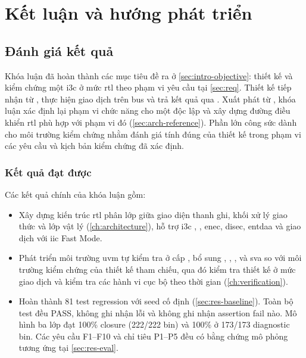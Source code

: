 \chapter{Kết luận và hướng phát triển}
\label{ch:conclusion}

\section{Đánh giá kết quả}

Khóa luận đã hoàn thành các mục tiêu đề ra ở \cref{sec:intro-objective}: thiết kế và kiểm chứng
một \gls{i3c} \Controller{} ở mức \gls{rtl} theo phạm vi yêu cầu tại \cref{sec:req}. Thiết kế tiếp nhận
\CommandDescriptor{} từ \Host{}, thực hiện giao dịch trên bus và trả kết quả qua
\ResponseDescriptor{}. Xuất phát từ \CHIPSAlliance{} \IThreeCCore{}, khóa luận xác định lại phạm vi
chức năng cho một \Controller{} độc lập và xây dựng đường điều khiển \gls{rtl} phù hợp với phạm vi đó
(\cref{sec:arch-reference}). Phần lớn công sức dành cho môi trường kiểm chứng nhằm đánh giá tính
đúng của thiết kế trong phạm vi các yêu cầu và kịch bản kiểm chứng đã xác định.

\subsection{Kết quả đạt được}

Các kết quả chính của khóa luận gồm:

\begin{itemize}
	\item Xây dựng kiến trúc \gls{rtl} phân lớp giữa giao diện thanh ghi, khối xử lý giao thức và lớp vật lý
	      (\cref{ch:architecture}), hỗ trợ \gls{i3c} \PrivateTransfer{}, \ImmediateDataTransfer{}, \gls{enec},
	      \gls{disec}, \gls{entdaa} và giao dịch với \Target{} \gls{iic} Fast Mode.

	\item Phát triển môi trường \gls{uvm} tự kiểm tra ở cấp \Controller{}, bổ sung \RegisterAgent{},
	      \Scoreboard{}, \ReferenceModel{}, \CorrelatedCoverage{} và \gls{sva} so với môi trường kiểm chứng
	      của thiết kế tham chiếu, qua đó kiểm tra thiết kế ở mức giao dịch và kiểm tra các hành vi cục bộ theo thời gian
	      (\cref{ch:verification}).

	\item Hoàn thành 81 test regression với seed cố định (\cref{sec:res-baseline}). Toàn bộ test
	      đều PASS, \Scoreboard{} không ghi nhận lỗi và không ghi nhận assertion fail nào. Mô hình \FunctionalCoverage{} ba lớp
	      đạt 100\% closure (222/222 bin) và 100\% ở 173/173 diagnostic bin. Các yêu cầu F1--F10 và
	      chỉ tiêu P1--P5 đều có bằng chứng mô phỏng tương ứng
	      tại \cref{sec:res-eval}.
\end{itemize}

